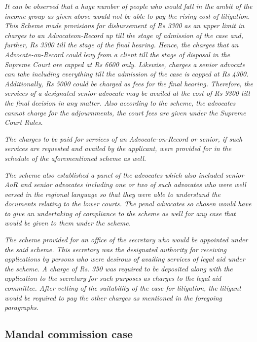 \begin{multicols}{2}
\noi
\textit{It can be observed that a huge number of people who would fall in the ambit of the income group as given above would not be able to pay the rising cost of litigation. This Scheme made provisions for disbursement of Rs 3300 as an upper limit in charges to an Advocateon-Record up till the stage of admission of the case and, further, Rs 3300 till the stage of the final hearing. Hence, the charges that an Advocate-on-Record could levy from a client till the stage of disposal in the Supreme Court are capped at Rs 6600 only. Likewise, charges a senior advocate can take including everything till the admission of the case is capped at Rs 4300. Additionally, Rs 5000 could be charged as fees for the final hearing. Therefore, the services of a designated senior advocate may be availed at the cost of Rs 9300 till the final decision in any matter. Also according to the scheme, the advocates cannot charge for the adjournments, the court fees are given under the Supreme Court Rules.}

\newpage

\noi
\textit{The charges to be paid for services of an Advocate-on-Record or senior, if such services are requested and availed by the applicant, were provided for in the schedule of the aforementioned scheme as well.}

\noi
\textit{The scheme also established a panel of the advocates which also included senior AoR and senior advocates including one or two of such advocates who were well versed in the regional language so that they were able to understand the documents relating to the lower courts. The penal advocates so chosen would have to give an undertaking of compliance to the scheme as well for any case that would be given to them under the scheme.}

\noi
\textit{The scheme provided for an office of the secretary who would be appointed under the said scheme. This secretary was the designated authority for receiving applications by persons who were desirous of availing services of legal aid under the scheme. A charge of Rs. 350 was required to be deposited along with the application to the secretary for such purposes as charges to the legal aid committee. After vetting of the suitability of the case for litigation, the litigant would be required to pay the other charges as mentioned in the foregoing paragraphs.}

\vspace{-.3cm}

\subsection*{Mandal commission case}


\end{multicols}
